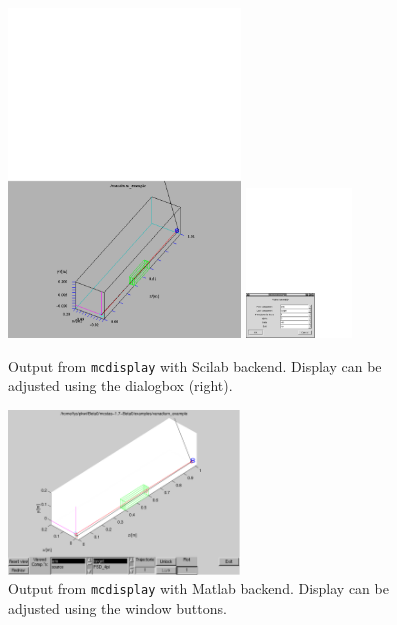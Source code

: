 \begin{figure}[htb!]
  \begin{center}
    \includegraphics[width=0.55\textwidth]{figures/mcdisplay_Scilab}
    \includegraphics[width=0.25\textwidth]{figures/mcdisplay_Scilab_dialog}
  \end{center}
\caption{Output from \texttt{mcdisplay} with Scilab backend. Display
  can be adjusted using the dialogbox (right).}
\label{fig:mcdisp_Scilab}
\end{figure}
\begin{figure}[htb!]
  \begin{center}
    \includegraphics[width=0.55\textwidth]{figures/mcdisplay_Matlab}
  \end{center}
\caption{Output from \texttt{mcdisplay} with Matlab backend. Display
  can be adjusted using the window buttons.}
\label{fig:mcdisp_Matlab}
\end{figure}

